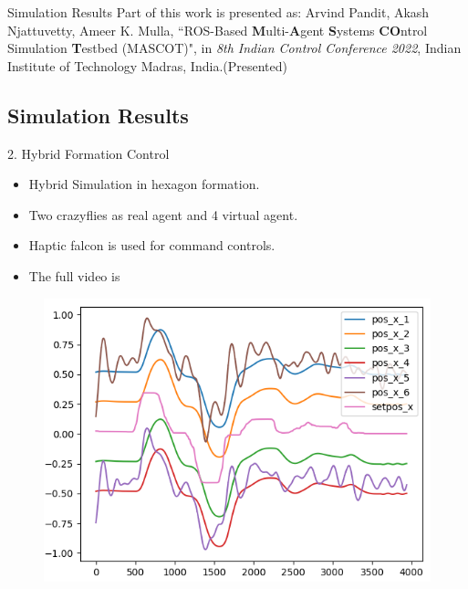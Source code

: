 \documentclass[10pt]{beamer}
\begin{document}
\begin{frame}{Simulation Results}
Part of this work is presented as:
\hspace{0.8cm}Arvind Pandit, Akash Njattuvetty, Ameer K. Mulla, ``ROS-Based \textbf{M}ulti-\textbf{A}gent \textbf{S}ystems \textbf{CO}ntrol Simulation \textbf{T}estbed (MASCOT)", in \textit{8th Indian Control Conference 2022}, Indian Institute of Technology Madras, India.(Presented)  
\end{frame}

\subsection*{Simulation Results}
\begin{frame}{}
    \begin{description}
        \item[2. Hybrid Formation Control]
    \end{description}{}
\begin{itemize}
    \item Hybrid Simulation in hexagon formation.
    \item Two crazyflies as real agent and 4 virtual agent.
    \item Haptic falcon is used for command controls.
    \item The full video is  
   \end{itemize}
   \begin{minipage}{0.47\textwidth}
    \begin{figure}[h!]
           \centering
           \includegraphics[scale=0.28]{hex_X.png} 

\end{figure}
\end{minipage}
\end{frame}
\end{document}
